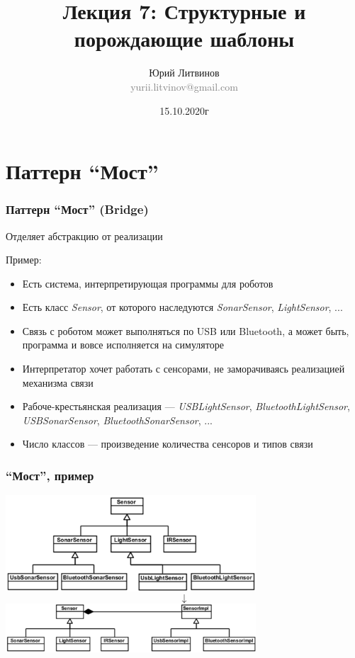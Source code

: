 \documentclass[xetex,mathserif,serif]{beamer}
\title[Шаблоны]{Лекция 7: Структурные и порождающие шаблоны}
\author[Юрий Литвинов]{Юрий Литвинов\\\small{\textcolor{gray}{yurii.litvinov@gmail.com}}}
\date{15.10.2020г}
\begin{document}
	\frame{\titlepage}

	\section{Паттерн ``Мост''}

	\begin{frame}
		\frametitle{Паттерн ``Мост'' (Bridge)}
		Отделяет абстракцию от реализации

		Пример:
		\begin{itemize}
			\item Есть система, интерпретирующая программы для роботов
			\item Есть класс \textit{Sensor}, от которого наследуются \textit{SonarSensor}, \textit{LightSensor}, ...
			\item Связь с роботом может выполняться по USB или Bluetooth, а может быть, программа и вовсе исполняется на симуляторе
			\item Интерпретатор хочет работать с сенсорами, не заморачиваясь реализацией механизма связи
			\item Рабоче-крестьянская реализация --- \textit{USBLightSensor}, \textit{BluetoothLightSensor}, \textit{USBSonarSensor}, \textit{BluetoothSonarSensor}, ...
			\item Число классов --- произведение количества сенсоров и типов связи
		\end{itemize}
	\end{frame}

	\begin{frame}
		\frametitle{``Мост'', пример}
		\begin{center}
			\includegraphics[width=0.7\textwidth]{noBridge.png}
			\Huge{$$\downarrow$$}
			\includegraphics[width=0.7\textwidth]{bridge.png}
		\end{center}
	\end{frame}
\end{document}

